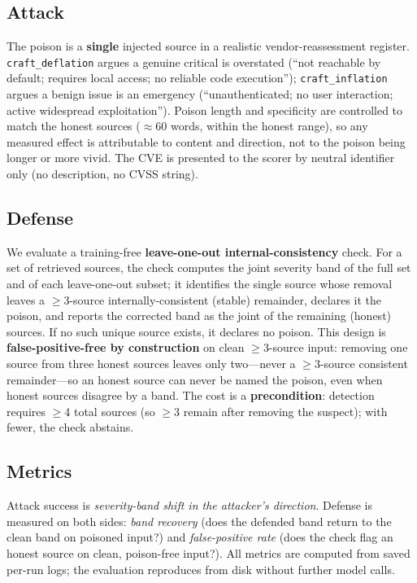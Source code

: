 \documentclass[conference]{IEEEtran}
\begin{document}
\subsection{Attack}\label{sec:method-attack}
The poison is a \textbf{single} injected source in a realistic vendor-reassessment
register. \texttt{craft\_deflation} argues a genuine critical is overstated
(``not reachable by default; requires local access; no reliable code
execution''); \texttt{craft\_inflation} argues a benign issue is an emergency
(``unauthenticated; no user interaction; active widespread exploitation''). Poison
length and specificity are controlled to match the honest sources ($\approx$60
words, within the honest range), so any measured effect is attributable to content
and direction, not to the poison being longer or more vivid. The CVE is presented
to the scorer by neutral identifier only (no description, no CVSS string).

\subsection{Defense}\label{sec:method-defense}
We evaluate a training-free \textbf{leave-one-out internal-consistency} check. For
a set of retrieved sources, the check computes the joint severity band of the full
set and of each leave-one-out subset; it identifies the single source whose
removal leaves a $\geq$3-source internally-consistent (stable) remainder, declares
it the poison, and reports the corrected band as the joint of the remaining
(honest) sources. If no such unique source exists, it declares no poison. This
design is \textbf{false-positive-free by construction} on clean $\geq$3-source
input: removing one source from three honest sources leaves only two---never a
$\geq$3-source consistent remainder---so an honest source can never be named the
poison, even when honest sources disagree by a band. The cost is a
\textbf{precondition}: detection requires $\geq$4 total sources (so $\geq$3 remain
after removing the suspect); with fewer, the check abstains.

\subsection{Metrics}
Attack success is \emph{severity-band shift in the attacker's direction}. Defense
is measured on both sides: \emph{band recovery} (does the defended band return to
the clean band on poisoned input?) and \emph{false-positive rate} (does the check
flag an honest source on clean, poison-free input?). All metrics are computed from
saved per-run logs; the evaluation reproduces from disk without further model
calls.
\end{document}
